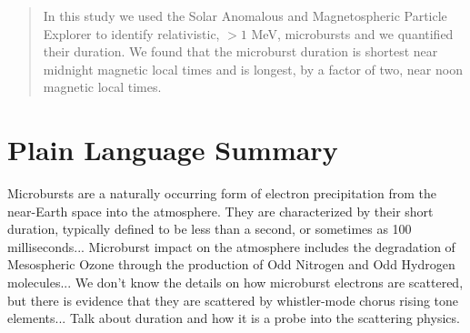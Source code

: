 \documentclass[draft]{agujournal2019}
\begin{document}
%
%

%
%


\begin{abstract}
In this study we used the Solar Anomalous and Magnetospheric Particle Explorer to identify relativistic, $>1$ MeV, microbursts and we quantified their duration. We found that the microburst duration is shortest near midnight magnetic local times and is longest, by a factor of two, near noon magnetic local times.
\end{abstract}

\section*{Plain Language Summary}
\noindent Microbursts are a naturally occurring form of electron precipitation from the near-Earth space into the atmosphere. They are characterized by their short duration, typically defined to be less than a second, or sometimes as 100 milliseconds... Microburst impact on the atmosphere includes the degradation of Mesospheric Ozone through the production of Odd Nitrogen and Odd Hydrogen molecules... We don't know the details on how microburst electrons are scattered, but there is evidence that they are scattered by whistler-mode chorus rising tone elements... Talk about duration and how it is a probe into the scattering physics.
\end{document}

